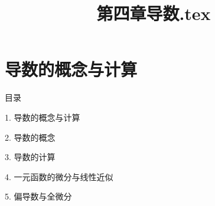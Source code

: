 \documentclass[aspectratio=169,10pt,fontset=fandol]{ctexbeamer}
\title{第四章导数.tex}
\begin{document}
\section{导数的概念与计算}
\begin{frame}[t,fragile]{目录}
\normalsize
{\color{blue}\normalsize 1. 导数的概念与计算\par}\vspace{0.22em}
{\color{gray!40}\normalsize 2. 导数的概念\par}\vspace{0.22em}
{\color{gray!40}\normalsize 3. 导数的计算\par}\vspace{0.22em}
{\color{gray!40}\normalsize 4. 一元函数的微分与线性近似\par}\vspace{0.22em}
{\color{gray!40}\normalsize 5. 偏导数与全微分\par}\vspace{0.22em}
\end{frame}
\end{document}
